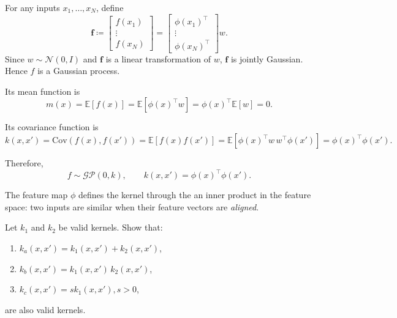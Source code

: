 \begin{solution}
For any inputs \(x_1,\ldots,x_N\), define
\[
\mathbf f \coloneqq 
\begin{bmatrix}
f(x_1)\\
\vdots\\
f(x_N)
\end{bmatrix}
=
\begin{bmatrix}
\phi(x_1)^\top\\
\vdots\\
\phi(x_N)^\top
\end{bmatrix} w.
\]
Since \(w\sim\mathcal N(0,I)\) and \(\mathbf f\) is a linear transformation of \(w\), \(\mathbf f\) is jointly Gaussian. Hence \(f\) is a Gaussian process.

Its mean function is
\[
m(x)=\mathbb E[f(x)]
=\mathbb E[\phi(x)^\top w]
=\phi(x)^\top \mathbb E[w]
=0.
\]

Its covariance function is
\[
k(x,x')
=\mathrm{Cov}(f(x),f(x'))
=\mathbb E[f(x)f(x')]
=\mathbb E[\phi(x)^\top w\, w^\top \phi(x')]
=\phi(x)^\top \phi(x').
\]

Therefore,
\[
f \sim \mathcal{GP}(0,k),
\qquad
k(x,x')=\phi(x)^\top \phi(x').
\]

The feature map \(\phi\) defines the kernel through the an inner product in the feature space: two inputs are similar when their feature vectors are \emph{aligned}.
\end{solution}


\begin{exercise}
    Let \(k_1\) and \(k_2\) be valid kernels. Show that:
    \begin{enumerate}
        \item \(k_a(x,x') = k_1(x,x') + k_2(x,x')\),
        \item \(k_b(x,x') = k_1(x,x')\,k_2(x,x')\),
        \item \(k_c(x,x') = sk_1(x,x'), s>0\),
    \end{enumerate}
    are also valid kernels.
\end{exercise}

